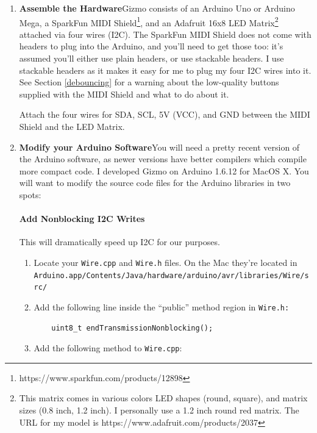 \documentclass{article}
\begin{document}
\begin{enumerate}

\item {\bf Assemble the Hardware}\quad Gizmo consists of an Arduino Uno or Arduino Mega, a SparkFun MIDI Shield\footnote{https:/\!/www.sparkfun.com/products/12898}, and an Adafruit 16x8 LED Matrix\footnote{This matrix comes in various colors LED shapes (round, square), and matrix sizes (0.8 inch, 1.2 inch).  I personally use a 1.2 inch round red matrix.  The URL for my model is https:/\!/www.adafruit.com/products/2037} attached via four wires (I2C).  The SparkFun MIDI Shield does not come with headers to plug into the Arduino, and you'll need to get those too: it's assumed you'll either use plain headers, or use stackable headers.  I use stackable headers as it makes it easy for me to plug my four I2C wires into it.  See Section \ref{debouncing} for a warning about the low-quality buttons supplied with the MIDI Shield and what to do about it.

Attach the four wires for SDA, SCL, 5V (VCC), and GND between the MIDI Shield and the LED Matrix.  

\item {\bf Modify your Arduino Software}\quad You will need a pretty recent version of the Arduino software, as newer versions have better compilers which compile more compact code.  I developed Gizmo on Arduino 1.6.12 for MacOS X.  You will want to modify the source code files for the Arduino libraries in two spots:

\paragraph{Add Nonblocking I2C Writes}  This will dramatically speed up I2C for our purposes.
\begin{enumerate}
\item Locate your \texttt{Wire.cpp} and \texttt{Wire.h} files.  On the Mac they're located in\\\texttt{Arduino.app/Contents/Java/hardware/arduino/avr/libraries/Wire/src/}

\item Add the following line inside the ``public'' method region in \texttt{Wire.h:}

\begin{verbatim}
    uint8_t endTransmissionNonblocking();
\end{verbatim}

\item Add the following method to \texttt{Wire.cpp}:


\end{enumerate}
\end{enumerate}
\end{document}
